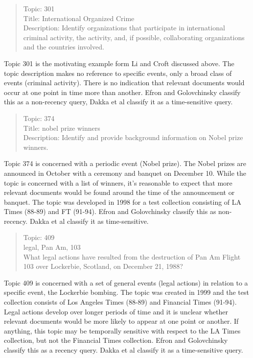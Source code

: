 \documentclass{sig-alternate}
\begin{document}
\begin{quote}
Topic: 301 \\
Title: International Organized Crime \\
Description: Identify organizations that participate in international criminal activity, the activity, and, if possible, collaborating organizations and the countries involved. \\
\end{quote}

Topic 301 is the motivating example form Li and Croft discussed above.  The topic description makes no reference to specific events, only a broad class of events (criminal activity).  There is no indication that relevant documents would occur at one point in time more than another. Efron and Golovchinsky classify this as a non-recency query, Dakka et al classify it as a time-sensitive query.

\begin{quote}
Topic: 374 \\
Title: nobel prize winners \\
Description:  Identify and provide background information on Nobel prize winners. \\
\end{quote}

Topic 374 is concerned with a periodic event (Nobel prize). The Nobel prizes are announced in October with a ceremony and banquet on December 10. While the topic is concerned with a list of winners, it's reasonable to expect that more relevant documents would be found around the time of the announcement or banquet. The topic was developed in 1998 for a test collection consisting of LA Times (88-89) and FT (91-94). Efron and Golovchinsky classify this as non-recency. Dakka et al classify it as time-sensitive.

\begin{quote}
Topic: 409	\\
legal, Pan Am, 103 \\
What legal actions have resulted from the destruction of Pan Am Flight 103 over Lockerbie, Scotland, on December 21, 1988?  \\
\end{quote}

Topic 409 is concerned with a set of general events (legal actions) in relation to a specific event, the Lockerbie bombing. The topic was created in 1999 and the test collection consists of Los Angeles Times (88-89) and Financial Times (91-94). Legal actions develop over longer periods of time and it is unclear whether relevant documents would be more likely to appear at one point or another.  If anything, this topic may be temporally sensitive with respect to the LA Times collection, but not the Financial Times collection. Efron and Golovchinsky classify this as a recency query. Dakka et al classify it as a time-sensitive query.
\end{document}
